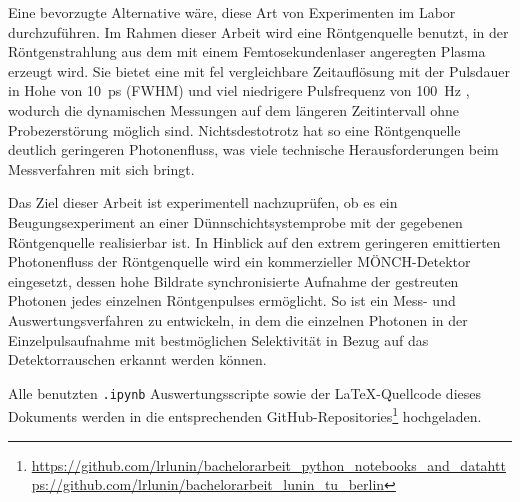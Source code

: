 \noindent
Eine bevorzugte Alternative wäre, diese Art von Experimenten im Labor durchzuführen. Im Rahmen dieser Arbeit wird eine Röntgenquelle benutzt, in der Röntgenstrahlung aus dem mit einem Femtosekundenlaser angeregten Plasma erzeugt wird. Sie bietet eine mit \gls{fel} vergleichbare Zeitauflösung mit der Pulsdauer in Hohe von \SI{10}{\pico\second} (FWHM) und viel niedrigere Pulsfrequenz von \SI{100}{\hertz} \cite{schick_laser-driven_2021}, wodurch die dynamischen Messungen auf dem längeren Zeitintervall ohne Probezerstörung möglich sind. Nichtsdestotrotz hat so eine Röntgenquelle deutlich geringeren Photonenfluss, was viele technische Herausforderungen beim Messverfahren mit sich bringt.

\noindent
Das Ziel dieser Arbeit ist experimentell nachzuprüfen, ob es ein Beugungsexperiment an einer Dünnschichtsystemprobe mit der gegebenen Röntgenquelle realisierbar ist. In Hinblick auf den extrem geringeren emittierten Photonenfluss der Röntgenquelle wird ein kommerzieller MÖNCH-Detektor \cite{ramilli-measurements-2017} eingesetzt, dessen hohe Bildrate synchronisierte Aufnahme der gestreuten Photonen jedes einzelnen Röntgenpulses ermöglicht. So ist ein Mess- und Auswertungsverfahren zu entwickeln, in dem die einzelnen Photonen in der Einzelpulsaufnahme mit bestmöglichen Selektivität in Bezug auf das Detektorrauschen erkannt werden können.

\noindent%
Alle benutzten \texttt{.ipynb} Auswertungsscripte sowie der \LaTeX-Quellcode dieses Dokuments werden in die entsprechenden GitHub-Repositories\footnote{\url{https://github.com/lrlunin/bachelorarbeit_python_notebooks_and_data}\newline\url{https://github.com/lrlunin/bachelorarbeit_lunin_tu_berlin}} hochgeladen.   


